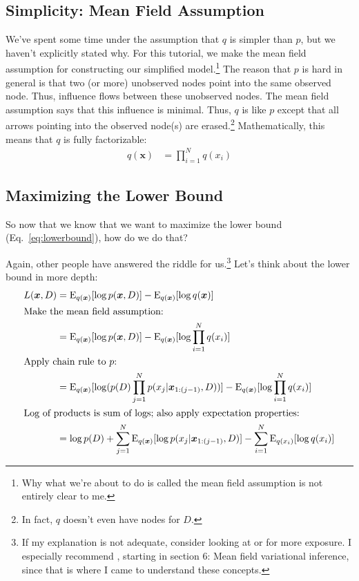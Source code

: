 \documentclass[12pt]{article}
\newcommand{\E}{\operatorname{E}}
\begin{document}
\subsection{Simplicity:  Mean Field Assumption}

We've spent some time under the assumption that $q$ is simpler than $p$, but we
haven't explicitly stated why.  For this tutorial, we make the mean field
assumption for constructing our simplified model.\footnote{Why what we're about
to do is called the mean field assumption is not entirely clear to me.}  The
reason that $p$ is hard in general is that two (or more) unobserved nodes point
into the same observed node.  Thus, influence flows between these unobserved
nodes.  The mean field assumption says that this influence is minimal.  Thus,
$q$ is like $p$ except that all arrows pointing into the observed node(s) are
erased.\footnote{In fact, $q$ doesn't even have nodes for $D$.}  Mathematically,
this means that $q$ is fully factorizable:
\begin{align}\label{eq:q}
    q(\bm{x}) &= \prod_{i=1}^{N} q(x_{i})
\end{align}

\subsection{Maximizing the Lower Bound}

So now that we know that we want to maximize the lower bound
(Eq.~\ref{eq:lowerbound}), how do we do that?

Again, other people have answered the riddle for us.\footnote{If my explanation
is not adequate, consider looking at \autocite{wikivar} or
\autocite{bleinotesvar} for more exposure.  I especially recommend
\autocite{bleinotesvar}, starting in section 6:  Mean field variational
inference, since that is where I came to understand these concepts.}  Let's
think about the lower bound in more depth:
\begin{align}
    L(\bm{x},D) &= \E_{q(\bm{x})}[\log p(\bm{x},D)]
    - \E_{q(\bm{x})}[\log q(\bm{x})]
    \nonumber \\
    \intertext{Make the mean field assumption:}
    &= \E_{q(\bm{x})}[\log p(\bm{x},D)]
    - \E_{q(\bm{x})}[\log \prod_{i=1}^{N} q(x_{i})]
    \nonumber \\
    \intertext{Apply chain rule to $p$:}
    &= \E_{q(\bm{x})}[\log (p(D)\prod_{j=1}^{N}p(x_{j}|\bm{x}_{1:(j-1)}, D))]
    - \E_{q(\bm{x})}[\log \prod_{i=1}^{N} q(x_{i})]
    \nonumber \\
    \intertext{Log of products is sum of logs; also apply expectation
    properties:}
    &= \log p(D) + \sum_{j=1}^{N} \E_{q(\bm{x})}[\log p(x_{j}|\bm{x}_{1:(j-1)},D)]
    - \sum_{i=1}^{N} \E_{q(x_{i})}[\log q(x_{i})]
\end{align}
\end{document}
